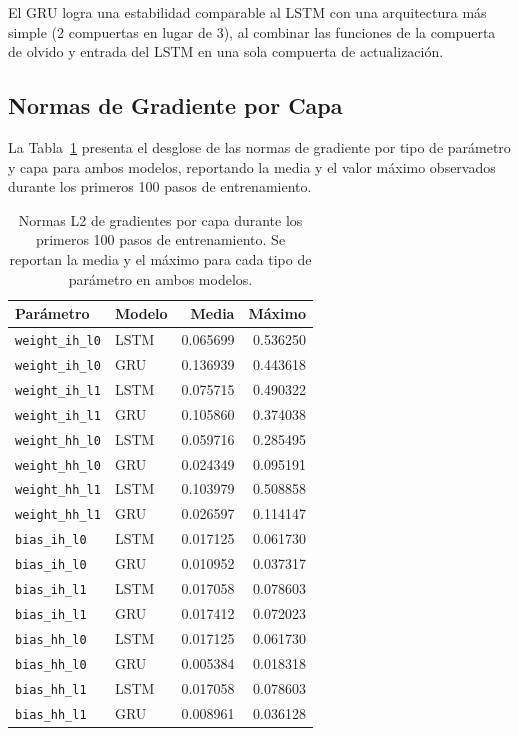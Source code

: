 El GRU logra una estabilidad comparable al LSTM con una arquitectura más simple
(2 compuertas en lugar de 3), al combinar las funciones de la compuerta de olvido
y entrada del LSTM en una sola compuerta de actualización.

\subsection{Normas de Gradiente por Capa}

La Tabla~\ref{tab:grad_norms} presenta el desglose de las normas de gradiente por
tipo de parámetro y capa para ambos modelos, reportando la media y el valor máximo
observados durante los primeros 100 pasos de entrenamiento.

\begin{table}[H]
\centering
\caption{Normas L2 de gradientes por capa durante los primeros 100 pasos de
entrenamiento. Se reportan la media y el máximo para cada tipo de parámetro en
ambos modelos.}
\label{tab:grad_norms}
\begin{tabular}{llrr}
\toprule
\textbf{Parámetro} & \textbf{Modelo} & \textbf{Media} & \textbf{Máximo} \\
\midrule
\texttt{weight\_ih\_l0} & LSTM & 0.065699 & 0.536250 \\
\texttt{weight\_ih\_l0} & GRU  & 0.136939 & 0.443618 \\
\midrule
\texttt{weight\_ih\_l1} & LSTM & 0.075715 & 0.490322 \\
\texttt{weight\_ih\_l1} & GRU  & 0.105860 & 0.374038 \\
\midrule
\texttt{weight\_hh\_l0} & LSTM & 0.059716 & 0.285495 \\
\texttt{weight\_hh\_l0} & GRU  & 0.024349 & 0.095191 \\
\midrule
\texttt{weight\_hh\_l1} & LSTM & 0.103979 & 0.508858 \\
\texttt{weight\_hh\_l1} & GRU  & 0.026597 & 0.114147 \\
\midrule
\texttt{bias\_ih\_l0}   & LSTM & 0.017125 & 0.061730 \\
\texttt{bias\_ih\_l0}   & GRU  & 0.010952 & 0.037317 \\
\midrule
\texttt{bias\_ih\_l1}   & LSTM & 0.017058 & 0.078603 \\
\texttt{bias\_ih\_l1}   & GRU  & 0.017412 & 0.072023 \\
\midrule
\texttt{bias\_hh\_l0}   & LSTM & 0.017125 & 0.061730 \\
\texttt{bias\_hh\_l0}   & GRU  & 0.005384 & 0.018318 \\
\midrule
\texttt{bias\_hh\_l1}   & LSTM & 0.017058 & 0.078603 \\
\texttt{bias\_hh\_l1}   & GRU  & 0.008961 & 0.036128 \\
\bottomrule
\end{tabular}
\end{table}

